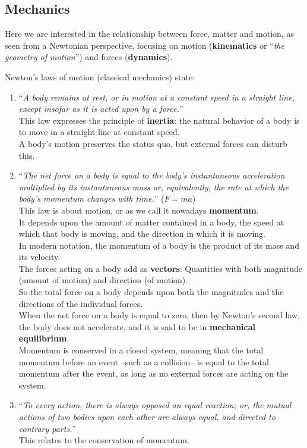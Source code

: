 \subsection{Mechanics}\label{subsec:mechanics}

Here we are interested in the relationship between force, matter and motion, as seen from a Newtonian perspective, focusing on motion (\textbf{kinematics} or ``\textit{the geometry of motion}'') and forces (\textbf{dynamics}).

Newton's laws of motion (classical mechanics) state:

\begin{enumerate}
    \item ``\textit{A body remains at rest, or in motion at a constant speed in a straight line, except insofar as it is acted upon by a force.}'' \\
    This law expresses the principle of \textbf{\gls{inertia}}: the natural behavior of a body is to move in a straight line at constant speed. \\
    A body's motion preserves the status quo, but external forces can disturb this.
    \item ``\textit{The net force on a body is equal to the body's instantaneous acceleration multiplied by its instantaneous mass or, equivalently, the rate at which the body's momentum changes with time.}'' ($F = ma$) \\
    This law is about motion, or as we call it nowadays \textbf{\gls{momentum}}. \\
    It depends upon the amount of matter contained in a body, the speed at which that body is moving, and the direction in which it is moving. \\
    In modern notation, the momentum of a body is the product of its mass and its velocity. \\
    The forces acting on a body add as \textbf{\gls{vector}s}: Quantities with both magnitude (amount of motion) and direction (of motion). \\
    So the total force on a body depends upon both the magnitudes and the directions of the individual forces. \\
    When the net force on a body is equal to zero, then by Newton's second law, the body does not accelerate, and it is said to be in \textbf{mechanical equilibrium}. \\
    Momentum is conserved in a closed system, meaning that the total momentum before an event --such as a collision-- is equal to the total momentum after the event, as long as no external forces are acting on the system.
    \item ``\textit{To every action, there is always opposed an equal reaction; or, the mutual actions of two bodies upon each other are always equal, and directed to contrary parts.}'' \\
    This relates to the conservation of momentum.
\end{enumerate}

